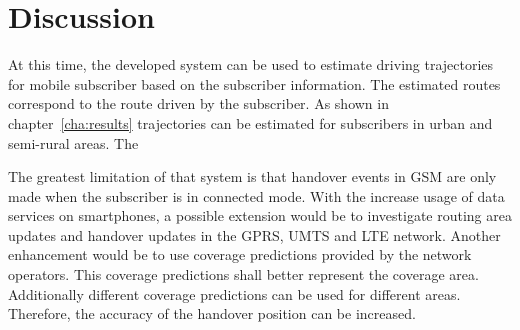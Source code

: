 \section{Discussion}
At this time, the developed system can be used to estimate driving trajectories for mobile subscriber based on the subscriber information. The estimated routes correspond to the route driven by the subscriber. As shown in chapter~\ref{cha:results} trajectories can be estimated for subscribers in urban and semi-rural areas.
The 

The greatest limitation of that system is that handover events in GSM are only made when the subscriber is in connected mode. With the increase usage of data services on smartphones, a possible extension would be to investigate routing area updates and handover updates in the GPRS, UMTS and LTE network.
Another enhancement would be to use coverage predictions provided by the network operators. This coverage predictions shall better represent the coverage area. Additionally different coverage predictions can be used for different areas. Therefore, the accuracy of the handover position can be increased. 